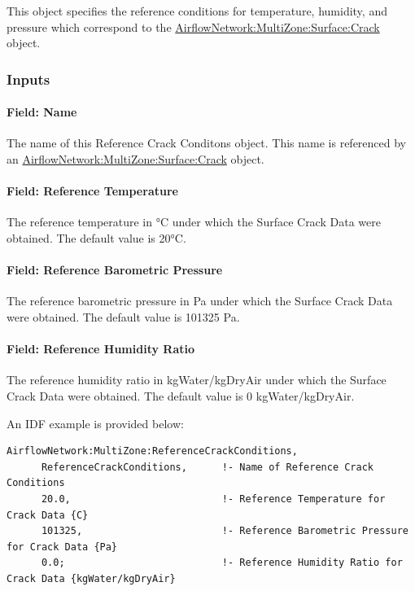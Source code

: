 This object specifies the reference conditions for temperature, humidity, and pressure which correspond to the \hyperref[airflownetworkmultizonesurfacecrack]{AirflowNetwork:MultiZone:Surface:Crack} object.

\subsubsection{Inputs}\label{inputs-1-004}

\paragraph{Field: Name}\label{field-name-1-003}

The name of this Reference Crack Conditons object. This name is referenced by an \hyperref[airflownetworkmultizonesurfacecrack]{AirflowNetwork:MultiZone:Surface:Crack} object.

\paragraph{Field: Reference Temperature}\label{field-reference-temperature}

The reference temperature in °C under which the Surface Crack Data were obtained. The default value is 20°C.

\paragraph{Field: Reference Barometric Pressure}\label{field-reference-barometric-pressure}

The reference barometric pressure in Pa under which the Surface Crack Data were obtained. The default value is 101325 Pa.

\paragraph{Field: Reference Humidity Ratio}\label{field-reference-humidity-ratio}

The reference humidity ratio in kgWater/kgDryAir under which the Surface Crack Data were obtained. The default value is 0 kgWater/kgDryAir.

An IDF example is provided below:

\begin{lstlisting}
AirflowNetwork:MultiZone:ReferenceCrackConditions,
      ReferenceCrackConditions,      !- Name of Reference Crack Conditions
      20.0,                          !- Reference Temperature for Crack Data {C}
      101325,                        !- Reference Barometric Pressure for Crack Data {Pa}
      0.0;                           !- Reference Humidity Ratio for Crack Data {kgWater/kgDryAir}
\end{lstlisting}


